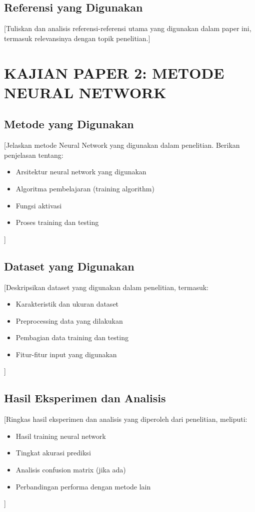 \documentclass[10pt,a4paper]{article}
\begin{document}
\subsection{Referensi yang Digunakan}

[Tuliskan dan analisis referensi-referensi utama yang digunakan dalam paper ini, termasuk relevansinya dengan topik penelitian.]

\section{KAJIAN PAPER 2: METODE NEURAL NETWORK}

\subsection{Metode yang Digunakan}

[Jelaskan metode Neural Network yang digunakan dalam penelitian. Berikan penjelasan tentang:
\begin{itemize}
    \item Arsitektur neural network yang digunakan
    \item Algoritma pembelajaran (training algorithm)
    \item Fungsi aktivasi
    \item Proses training dan testing
\end{itemize}]

\subsection{Dataset yang Digunakan}

[Deskripsikan dataset yang digunakan dalam penelitian, termasuk:
\begin{itemize}
    \item Karakteristik dan ukuran dataset
    \item Preprocessing data yang dilakukan
    \item Pembagian data training dan testing
    \item Fitur-fitur input yang digunakan
\end{itemize}]

\subsection{Hasil Eksperimen dan Analisis}

[Ringkas hasil eksperimen dan analisis yang diperoleh dari penelitian, meliputi:
\begin{itemize}
    \item Hasil training neural network
    \item Tingkat akurasi prediksi
    \item Analisis confusion matrix (jika ada)
    \item Perbandingan performa dengan metode lain
\end{itemize}]
\end{document}
